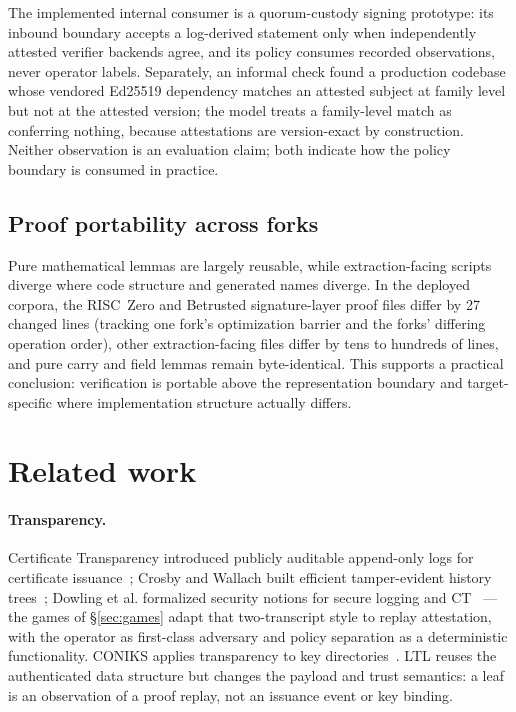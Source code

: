 \documentclass[11pt]{article}
\theoremstyle{remark}
\begin{document}
The implemented internal consumer is a quorum-custody signing prototype: its
inbound boundary accepts a log-derived statement only when independently
attested verifier backends agree, and its policy consumes recorded
observations, never operator labels. Separately, an informal check found a
production codebase whose vendored Ed25519 dependency matches an attested
subject at family level but not at the attested version; the model treats a
family-level match as conferring nothing, because attestations are
version-exact by construction. Neither observation is an evaluation claim;
both indicate how the policy boundary is consumed in practice.

\subsection{Proof portability across forks}

Pure mathematical lemmas are largely reusable, while extraction-facing scripts
diverge where code structure and generated names diverge. In the deployed
corpora, the RISC~Zero and Betrusted signature-layer proof files differ by 27
changed lines (tracking one fork's optimization barrier and the forks'
differing operation order), other extraction-facing files differ by tens to
hundreds of lines, and pure carry and field lemmas remain byte-identical. This supports a practical conclusion: verification is portable
above the representation boundary and target-specific where implementation
structure actually differs.

\section{Related work}\label{sec:related}

\paragraph{Transparency.}
Certificate Transparency introduced publicly auditable append-only logs for
certificate issuance~\cite{ct1,ct2}; Crosby and Wallach built efficient
tamper-evident history trees~\cite{crosby}; Dowling et al. formalized security
notions for secure logging and CT~\cite{dghs} --- the games of
\S\ref{sec:games} adapt that two-transcript style to replay attestation, with
the operator as first-class adversary and policy separation as a deterministic
functionality. CONIKS applies transparency to
key directories~\cite{coniks}. LTL reuses the authenticated data structure but
changes the payload and trust semantics: a leaf is an observation of a proof
replay, not an issuance event or key binding.
\end{document}
